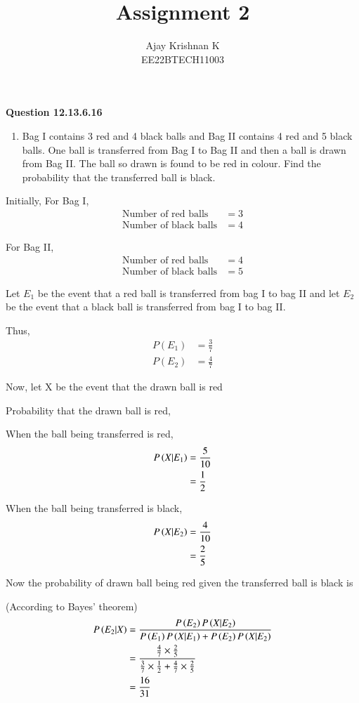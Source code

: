 \documentclass[journal,11pt]{IEEEtran}
\begin{document}
\vspace{3cm}
\author{Ajay Krishnan K\\EE22BTECH11003}

\title{Assignment 2}
\maketitle

\textbf{Question 12.13.6.16}
\begin{enumerate}
    \item Bag I contains 3 red and 4 black balls and Bag II contains 4 red and 5 black balls.
    One ball is transferred from Bag I to Bag II and then a ball is drawn from Bag II.
    The ball so drawn is found to be red in colour. Find the probability that the
    transferred ball is black.
\end{enumerate}

\solution

Initially,
For Bag I,
\begin{align}
    \text{Number of red balls} &=3 \\
    \text{Number of black balls} &= 4
\end{align}

For Bag II,
\begin{align}
    \text{Number of red balls} &= 4 \\
    \text{Number of black balls} &= 5 
\end{align}

Let $E_1$ be the event that a red ball is transferred from bag I to bag II
and let $E_2$ be the event that a black ball is transferred from bag I to bag II.

Thus,
\begin{align}
    P(E_1) &= \frac{3}{7} \\
    P(E_2) &= \frac{4}{7}
\end{align}

Now, let X be the event that the drawn ball is red

Probability that the drawn ball is red,

When the ball being transferred is red,
\begin{align}
    P\left(X\middle|E_1\right) &= \frac{5}{10}\\
    &=\frac{1}{2}
\end{align}

When the ball being transferred is black,
\begin{align}
    P\left(X\middle|E_2\right) &= \frac{4}{10}\\
    &=\frac{2}{5}
\end{align}

Now the probability of drawn ball being red given the transferred ball 
is black is

(According to Bayes' theorem)
\begin{align}
    P\left(E_2\middle|X\right) &= \frac{P\left(E_2\right)P\left(X\middle|E_2\right)}{P\left(E_1\right)P\left(X\middle|E_1\right) + P\left(E_2\right)P\left(X\middle|E_2\right)}\\
    &= \frac{\frac{4}{7} \times \frac{2}{5}}{\frac{3}{7}\times\frac{1}{2}+\frac{4}{7}\times\frac{2}{5}}\\
    &= \frac{16}{31}
\end{align}
\end{document}

